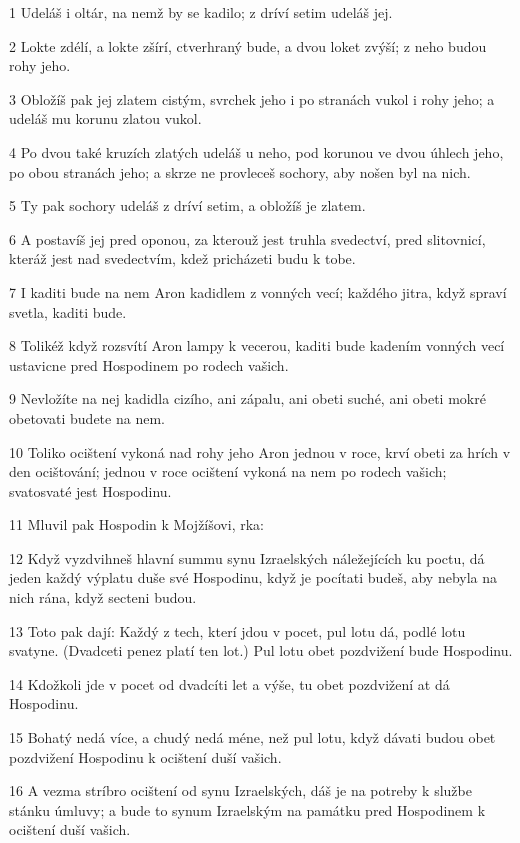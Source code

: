 \par 1 Udeláš i oltár, na nemž by se kadilo; z dríví setim udeláš jej.
\par 2 Lokte zdélí, a lokte zšírí, ctverhraný bude, a dvou loket zvýší; z neho budou rohy jeho.
\par 3 Obložíš pak jej zlatem cistým, svrchek jeho i po stranách vukol i rohy jeho; a udeláš mu korunu zlatou vukol.
\par 4 Po dvou také kruzích zlatých udeláš u neho, pod korunou ve dvou úhlech jeho, po obou stranách jeho; a skrze ne provleceš sochory, aby nošen byl na nich.
\par 5 Ty pak sochory udeláš z dríví setim, a obložíš je zlatem.
\par 6 A postavíš jej pred oponou, za kterouž jest truhla svedectví, pred slitovnicí, kteráž jest nad svedectvím, kdež pricházeti budu k tobe.
\par 7 I kaditi bude na nem Aron kadidlem z vonných vecí; každého jitra, když spraví svetla, kaditi bude.
\par 8 Tolikéž když rozsvítí Aron lampy k vecerou, kaditi bude kadením vonných vecí ustavicne pred Hospodinem po rodech vašich.
\par 9 Nevložíte na nej kadidla cizího, ani zápalu, ani obeti suché, ani obeti mokré obetovati budete na nem.
\par 10 Toliko ocištení vykoná nad rohy jeho Aron jednou v roce, krví obeti za hrích v den ocištování; jednou v roce ocištení vykoná na nem po rodech vašich; svatosvaté jest Hospodinu.
\par 11 Mluvil pak Hospodin k Mojžíšovi, rka:
\par 12 Když vyzdvihneš hlavní summu synu Izraelských náležejících ku poctu, dá jeden každý výplatu duše své Hospodinu, když je pocítati budeš, aby nebyla na nich rána, když secteni budou.
\par 13 Toto pak dají: Každý z tech, kterí jdou v pocet, pul lotu dá, podlé lotu svatyne. (Dvadceti penez platí ten lot.) Pul lotu obet pozdvižení bude Hospodinu.
\par 14 Kdožkoli jde v pocet od dvadcíti let a výše, tu obet pozdvižení at dá Hospodinu.
\par 15 Bohatý nedá více, a chudý nedá méne, než pul lotu, když dávati budou obet pozdvižení Hospodinu k ocištení duší vašich.
\par 16 A vezma stríbro ocištení od synu Izraelských, dáš je na potreby k službe stánku úmluvy; a bude to synum Izraelským na památku pred Hospodinem k ocištení duší vašich.
